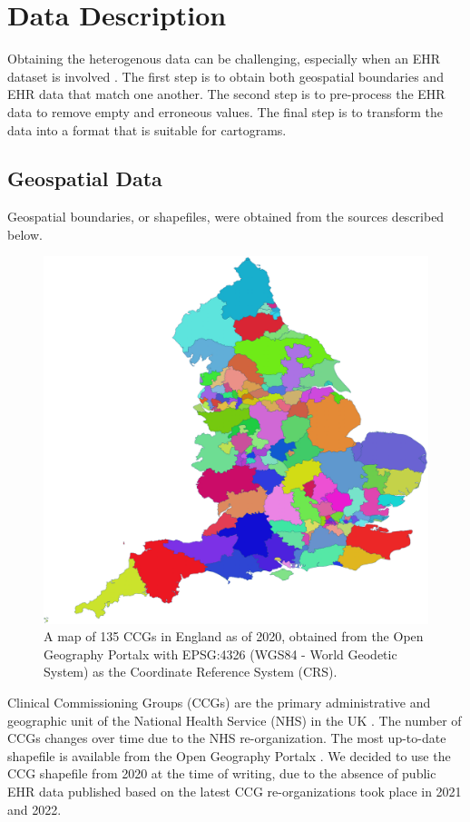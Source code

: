 \section{Data Description}

Obtaining the heterogenous data can be challenging, especially when an EHR dataset is involved \cite{wang2021EHRa}. The first step is to obtain both geospatial boundaries and EHR data that match one another. The second step is to pre-process the EHR data to remove empty and erroneous values. The final step is to transform the data into a format that is suitable for cartograms.

\subsection{Geospatial Data}

Geospatial boundaries, or shapefiles, were obtained from the sources described below.
{
\begin{figure}[tb!]
    \centering
    \includegraphics[width=0.6\columnwidth]{figure/ccg.png}
    \caption{A map of 135 CCGs in England as of 2020, obtained from the Open Geography Portalx \cite{opengeographyportalxOpen} with EPSG:4326 (WGS84 - World Geodetic System) as the Coordinate Reference System (CRS).}
    \label{fig:ccg}
\end{figure}
}

 Clinical Commissioning Groups (CCGs) are the primary administrative and geographic unit of the National Health Service (NHS) in the UK \cite{nhsNHS}. The number of CCGs changes over time due to the NHS re-organization. The most up-to-date shapefile is available from the Open Geography Portalx \cite{opengeographyportalxOpen}. We decided to use the CCG shapefile from 2020 at the time of writing, due to the absence of public EHR data published based on the latest CCG re-organizations took place in 2021 and 2022.

